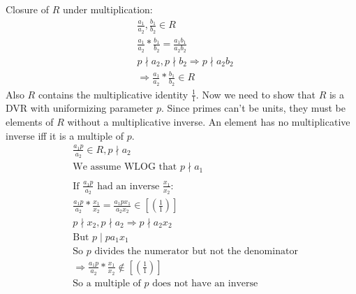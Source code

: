 \documentclass[11pt]{article}
\begin{document}
{  Closure of $R$ under multiplication:
  \begin{align*}
     & \frac{a_1}{a_2}, \frac{b_1}{b_2} \in R                   \\
     & \frac{a_1}{a_2}* \frac{b_1}{b_2} = \frac{a_1b_1}{a_2b_2} \\
     & p \nmid a_2, p \nmid b_2 \Rightarrow p \nmid a_2b_2      \\
     & \Rightarrow \frac{a_1}{a_2}* \frac{b_1}{b_2} \in R
  \end{align*}
  Also $R$ contains the multiplicative identity $\frac{1}{1}$.
  \newline
  Now we need to show that $R$ is a DVR with uniformizing parameter $p$.
  \newline
  Since primes can't be units, they must be elements of $R$ without a multiplicative inverse. An element has no multiplicative inverse iff it is a multiple of $p$.
  \begin{align*}
     & \frac{a_1p}{a_2} \in R, p \nmid a_2                                                                     \\
     & \text{We assume WLOG that $p \nmid a_1$}                                                                \\
     &                                                                                                         \\
     & \text{If $\frac{a_1p}{a_2}$ had an inverse $\frac{x_1}{x_2}$:}                                          \\
     & \frac{a_1p}{a_2}*\frac{x_1}{x_2} = \frac{a_1px_1}{a_2x_2} \in \left[ \left( \frac{1}{1} \right) \right] \\
     & p \nmid x_2, p \nmid a_2 \Rightarrow p \nmid a_2x_2                                                     \\
     & \text{But } p \mid pa_1x_1                                                                              \\
     & \text{So $p$ divides the numerator but not the denominator}                                             \\
     & \Rightarrow \frac{a_1p}{a_2}*\frac{x_1}{x_2} \notin \left[ \left( \frac{1}{1} \right) \right]           \\
     & \text{So a multiple of $p$ does not have an inverse}                                                    \\
     &                                                                                                         \\

\end{align*}}
\end{document}

